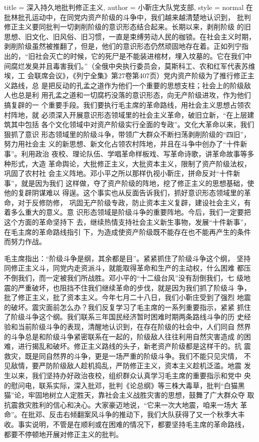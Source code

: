 \begin{hongqiarticle}{
        title  = {深入持久地批判修正主义},
        author = {小靳庄大队党支部},
        style  = normal
    }
    在批林批孔运动中，在同党内资产阶级的斗争中，我们越来越清楚地认识到，
    批判修正主义要同批判一切剥削阶级的意识形态结合起来。长期以来，剥削阶级
    的旧思想、旧文化、旧风俗、旧习惯，一直是束缚劳动人民的枷锁。在社会主义时期，
    剥削阶级虽然被推翻了，但是，他们的意识形态仍然顽固地存在着。正如列宁指
    出的，“旧社会灭亡的时候，它的死尸是不能装进棺材，埋入坟墓的。它在我们中
    间腐烂发臭并且毒害我们。”（全俄中央执行委员会，莫斯科工、农和红军代表苏维埃，工
    会联席会议》，《列宁全集》第27卷第407页）党内资产阶级为了推行修正主义路线，总
    是把反动的孔孟之道作为他们一个重要的思想支柱；社会上的阶级敌人也总是利
    用孔孟之道和一切腐朽没落的意识形态，向无产阶级进攻，作为他们搞复辟的一
    个重要手段。我们要执行毛主席的革命路线，用社会主义思想占领农村阵地，就
    必须深入开展意识形态领域里的社会主义革命，破旧立新，“在上层建筑其中包括
    各个文化领域中对资产阶级实行全面的专政”。文化大革命以来，我们狠抓了意识
    形态领域里的阶级斗争，带领广大群众不断扫荡剥削阶级的“四旧”，努力用社会主
    义的新思想、新文化占领农村阵地，并且在斗争中创办了“十件新事”。利用政治
    夜校、理论队伍、学唱革命样板戏、写革命诗歌，讲革命故事等多种形式，大造
    革命舆论，大批修正主义，大批资本主义，限制了资产阶级法权，巩固了农村社
    会主义阵地。邓小平之所以那样仇视小靳庄，拼命反对“十件新事”，就是因为我们
    这样做，夺了资产阶级的阵地，挖了修正主义的思想基础，使他的复辟阴谋难以
    得逞。这个事实也从反面告诉我们，抓好意识形态领域里的革命，对于反修防修，
    巩固无产阶级专政，防止资本主义复辟，建设社会主义，有着多么重大的意义。意
    识形态领域是阶级斗争的重要阵地。今后，我们一定要把这个方面的革命坚持下
    去，继续热情支持社会主义新生事物，发展“十件新事”，在毛主席的革命路线指引
    下，为造成使资产阶级既不能存在也不能再产生的条件而努力作战。

    毛主席指出：“阶级斗争是纲，其余都是目”。紧紧抓住了阶级斗争这个纲，
    坚持同修正主义斗，同党内走资派斗，就能取得革命和生产的主动权，什么困难
    都压不倒我们，而一定被我们所战胜。邓小平的“十二级台风”没有刮倒我们，七
    级地震的严重破坏，也阻挡不住我们继续革命的步伐，就是因为我们抓了阶级斗
    争，批了修正主义，批了资本主义。今年七月二十八日，我们小靳庄受到了强烈
    地震的破坏。震灾面前怎么办？我们反复学习了毛主席的一系列重要指示，紧紧
    抓住了阶级斗争这个纲。我们联系三年国民经济暂时困难时期两条路线斗争的历
    史经验和当前阶级斗争的表现，清醒地认识到，在存在阶级的社会中，人们同自
    然界的斗争总是和阶级斗争紧密联系在一起的，阶级敌人往往利用自然灾害造成
    的困难，进行揭乱和破坏。修正主义路线的头子，新老资产阶级都是这样干的。抗
    震救灾，既是同自然界的斗争，更是一场严重的阶级斗争。我们不能只见灾情，
    不见敌情，要严防阶级敌人趁机捣乱，严防修正主义，资本主义趁机泛滥。地震
    发生以来，我们坚持办好政治夜校，组织群众认真学习毛主席的重要指示和党中
    央的慰问电，联系实际，深入批邓，批判《论总纲》等三株大毒草，批判“白猫黑
    猫”论，牢固地树立人定胜天，靠社会主义战胜灾害的思想，鼓舞了广大群众夺
    取抗震救灾胜利的信心和决心。大家豪迈地说，“它来一次大地震，咱来一场大
    革命”。在批邓、反击右倾翻案风斗争的推动下，我们大队获得了又一个秋季大丰
    收。事实说明，不管是在顺利或在困难的情况下，都要坚持毛主席的革命路线，
    都要不停顿地开展对修正主义的批判。


\end{hongqiarticle}
